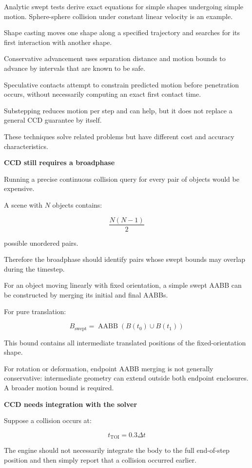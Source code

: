 Analytic swept tests derive exact equations for simple shapes undergoing simple motion. Sphere-sphere collision under constant linear velocity is an example.

Shape casting moves one shape along a specified trajectory and searches for its first interaction with another shape.

Conservative advancement uses separation distance and motion bounds to advance by intervals that are known to be safe.

Speculative contacts attempt to constrain predicted motion before penetration occurs, without necessarily computing an exact first contact time.

Substepping reduces motion per step and can help, but it does not replace a general CCD guarantee by itself.

These techniques solve related problems but have different cost and accuracy characteristics.

\textbf{CCD still requires a broadphase}

Running a precise continuous collision query for every pair of objects would be expensive.

A scene with \(N\) objects contains:

\[
\frac{N(N-1)}2
\]

possible unordered pairs.

Therefore the broadphase should identify pairs whose swept bounds may overlap during the timestep.

For an object moving linearly with fixed orientation, a simple swept AABB can be constructed by merging its initial and final AABBs.

For pure translation:

\[
\boxed{ B_{\mathrm{swept}} = \operatorname{AABB}(B(t_0)\cup B(t_1)) }
\]

This bound contains all intermediate translated positions of the fixed-orientation shape.

For rotation or deformation, endpoint AABB merging is not generally conservative: intermediate geometry can extend outside both endpoint enclosures. A broader motion bound is required.

\textbf{CCD needs integration with the solver}

Suppose a collision occurs at:

\[
t_{\mathrm{TOI}}=0.3\Delta t
\]

The engine should not necessarily integrate the body to the full end-of-step position and then simply report that a collision occurred earlier.

